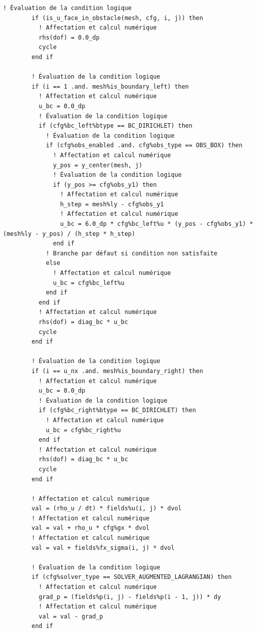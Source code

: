 \documentclass[10pt,a4paper,oneside]{book}
\begin{document}
\begin{lstlisting}[language={[95]Fortran}]
        ! Évaluation de la condition logique
        if (is_u_face_in_obstacle(mesh, cfg, i, j)) then
          ! Affectation et calcul numérique
          rhs(dof) = 0.0_dp
          cycle
        end if

        ! Évaluation de la condition logique
        if (i == 1 .and. mesh%is_boundary_left) then
          ! Affectation et calcul numérique
          u_bc = 0.0_dp
          ! Évaluation de la condition logique
          if (cfg%bc_left%btype == BC_DIRICHLET) then
            ! Évaluation de la condition logique
            if (cfg%obs_enabled .and. cfg%obs_type == OBS_BOX) then
              ! Affectation et calcul numérique
              y_pos = y_center(mesh, j)
              ! Évaluation de la condition logique
              if (y_pos >= cfg%obs_y1) then
                ! Affectation et calcul numérique
                h_step = mesh%ly - cfg%obs_y1
                ! Affectation et calcul numérique
                u_bc = 6.0_dp * cfg%bc_left%u * (y_pos - cfg%obs_y1) * (mesh%ly - y_pos) / (h_step * h_step)
              end if
            ! Branche par défaut si condition non satisfaite
            else
              ! Affectation et calcul numérique
              u_bc = cfg%bc_left%u
            end if
          end if
          ! Affectation et calcul numérique
          rhs(dof) = diag_bc * u_bc
          cycle
        end if

        ! Évaluation de la condition logique
        if (i == u_nx .and. mesh%is_boundary_right) then
          ! Affectation et calcul numérique
          u_bc = 0.0_dp
          ! Évaluation de la condition logique
          if (cfg%bc_right%btype == BC_DIRICHLET) then
            ! Affectation et calcul numérique
            u_bc = cfg%bc_right%u
          end if
          ! Affectation et calcul numérique
          rhs(dof) = diag_bc * u_bc
          cycle
        end if

        ! Affectation et calcul numérique
        val = (rho_u / dt) * fields%u(i, j) * dvol
        ! Affectation et calcul numérique
        val = val + rho_u * cfg%gx * dvol
        ! Affectation et calcul numérique
        val = val + fields%fx_sigma(i, j) * dvol

        ! Évaluation de la condition logique
        if (cfg%solver_type == SOLVER_AUGMENTED_LAGRANGIAN) then
          ! Affectation et calcul numérique
          grad_p = (fields%p(i, j) - fields%p(i - 1, j)) * dy
          ! Affectation et calcul numérique
          val = val - grad_p
        end if


\end{lstlisting}
\end{document}

